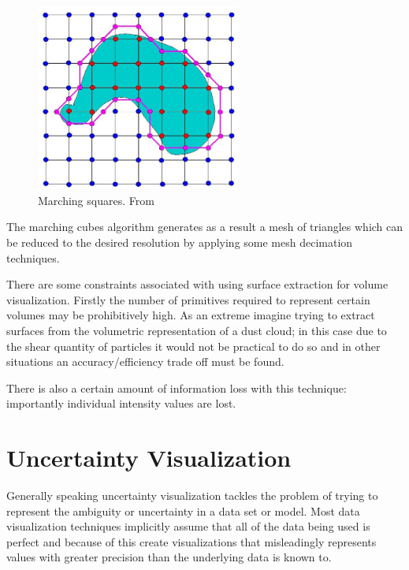 \begin{figure}
  \vspace{-20pt}
  \includegraphics[width=0.6\textwidth]{images/background/marching_squares.jpg}
  \caption{Marching squares. From \cite{marching_squares:image}}\label{fig:marching_squares}
\end{figure}

The marching cubes algorithm generates as a result a mesh of triangles which can be reduced to the desired resolution by applying some mesh decimation techniques.

There are some constraints associated with using surface extraction for volume visualization. Firstly the number of primitives required to represent certain volumes may be prohibitively high. As an extreme imagine trying to extract surfaces from the volumetric representation of a dust cloud; in this case due to the shear quantity of particles it would not be practical to do so and in other situations an accuracy/efficiency trade off must be found.

There is also a certain amount of information loss with this technique: importantly individual intensity values are lost.

\newpage
\section{Uncertainty Visualization}\label{background:uncertaintyvisualization}
Generally speaking uncertainty visualization tackles the problem of trying to represent the ambiguity or uncertainty in a data set or model. Most data visualization techniques implicitly assume that all of the data being used is perfect and because of this create visualizations that misleadingly represents values with greater precision than the underlying data is known to\cite{uncertaintyoverview}.

